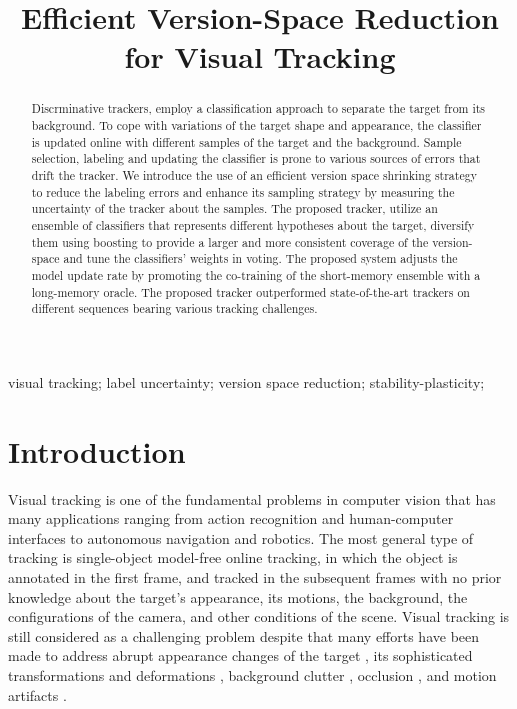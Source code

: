 \documentclass[10pt, conference, compsocconf]{IEEEtran}
\begin{document}
\title{Efficient Version-Space Reduction for Visual Tracking}

\author{
}

\maketitle


\begin{abstract}
Discrminative trackers, employ a classification approach to separate the target from its background. To cope with variations of the target shape and appearance, the classifier is updated online with different samples of the target and the background. Sample selection, labeling and updating the classifier is prone to various sources of errors that drift the tracker. We introduce the use of an efficient version space shrinking strategy to reduce the labeling errors and enhance its sampling strategy by measuring the uncertainty of the tracker about the samples. The proposed tracker, utilize an ensemble of classifiers that represents different hypotheses about the target, diversify them using boosting to provide a larger and more consistent coverage of the version-space and tune the classifiers' weights in voting. The proposed system adjusts the model update rate by promoting the co-training of the short-memory ensemble with a long-memory oracle. The proposed tracker outperformed state-of-the-art trackers on different sequences bearing various tracking challenges.
\end{abstract}

\begin{IEEEkeywords}
visual tracking; label uncertainty; version space reduction; stability-plasticity;

\end{IEEEkeywords}
\IEEEpeerreviewmaketitle

\section{Introduction}
\label{sec1}

Visual tracking is one of the fundamental problems in computer vision that has many applications ranging from action recognition and human-computer interfaces to autonomous navigation and robotics. The most general type of tracking is single-object model-free online tracking, in which the object is annotated in the first frame, and tracked in the subsequent frames with no prior knowledge about the target's appearance, its motions, the background, the configurations of the camera, and other conditions of the scene. Visual tracking is still considered as a challenging problem despite that many efforts have been made to address abrupt appearance changes of the target \cite{bao2012real}, its sophisticated transformations \cite{kwon2011tracking} and deformations \cite{hare2011struck}, background clutter \cite{dinh2011context}, occlusion \cite{meshgi2016data}, and motion artifacts \cite{wu2011blurred}. 
\end{document}
